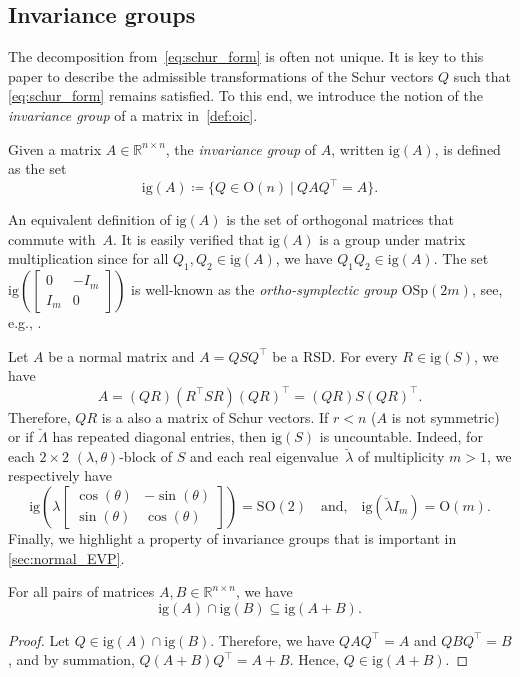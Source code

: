 \documentclass[10pt,twoside,dvipsnames]{siamart1116}
\numberwithin{algorithm}{section}
\numberwithin{equation}{section}
\begin{document}
\subsection{Invariance groups} The decomposition from~\eqref{eq:schur_form} is often not unique. It is key to this paper to describe the admissible transformations of the Schur vectors $Q$ such that \eqref{eq:schur_form} remains satisfied. To this end, we introduce the notion of the \emph{invariance group} of a matrix in~\cref{def:oic}.
\begin{definition}\label{def:oic}
Given a matrix $A\in\mathbb{R}^{n\times n}$, the \emph{invariance group} of $A$, written $\mathrm{ig}(A)$, is defined as the set
	\begin{equation}
	\label{eq:invariance_group}
	\mathrm{ig}(A)\coloneq\{Q\in\mathrm{O}(n)\ | \ QAQ^\top  = A\}.
	\end{equation}
	\end{definition}
	An equivalent definition of $\mathrm{ig}(A)$ is the set of orthogonal matrices that commute with~$A$. It is easily verified that $\mathrm{ig}(A)$ is a group under matrix multiplication since for all $Q_1,Q_2\in\mathrm{ig}(A)$, we have $Q_1Q_2\in\mathrm{ig}(A)$. The set $\mathrm{ig}\left(\left[\begin{smallmatrix}0&-I_m\\
	I_m&0\end{smallmatrix}\right]\right)$ is well-known as the \emph{ortho-symplectic group} $\mathrm{OSp}(2m)$, see, e.g., \cite{dopico09}.

Let $A$ be a normal matrix and $A=QSQ^\top$ be a RSD. For every $R\in\mathrm{ig}(S)$, we have \begin{equation*}
	A =(QR)(R^\top SR)(QR)^\top = (QR)S(QR)^\top.
\end{equation*}
Therefore, $QR$ is a also a matrix of Schur vectors. If $r<n$ ($A$ is not symmetric) or if $\breve{\Lambda}$ has repeated diagonal entries, then $\mathrm{ig}(S)$ is uncountable. Indeed, for each $2\times 2$ $(\lambda,\theta)$-block of $S$ and each real eigenvalue~$\breve{\lambda}$ of multiplicity $m>1$, we respectively have
\begin{equation}
\nonumber
\mathrm{ig}\left(\lambda\begin{bmatrix}
\cos(\theta)&-\sin(\theta)\\
\sin(\theta)&\cos(\theta)
\end{bmatrix}\right) = \mathrm{SO}(2)\quad\text{and,}\quad\mathrm{ig}(\breve{\lambda} I_m)=\mathrm{O}(m).
\end{equation}
Finally, we highlight a property of invariance groups that is important in \cref{sec:normal_EVP}.
\begin{lemma}\label{lem:oic_linearity}
For all pairs of matrices $A,B\in\mathbb{R}^{n\times n}$, we have $$\mathrm{ig}(A)\cap \mathrm{ig}(B)\subseteq \mathrm{ig}(A+B). $$
\end{lemma}
\begin{proof}
Let $Q\in \mathrm{ig}(A)\cap \mathrm{ig}(B)$. Therefore, we have $QAQ^\top =A$ and $QBQ^\top =B$, and by summation, $Q(A+B)Q^\top =A+B$. Hence, $Q\in\mathrm{ig}(A+B)$.
\end{proof}
\end{document}
